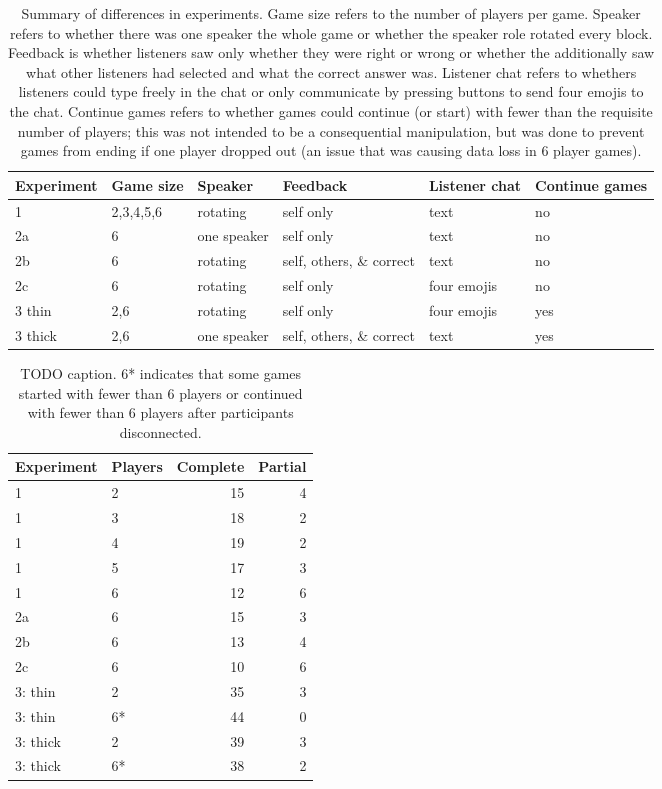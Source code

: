 \documentclass[
  english,
  a4paper,
]{article}
\begin{document}
\begin{table}

\caption{\label{tab:overview}Summary of differences in experiments. Game size refers to the number of players per game. Speaker refers to whether there was one speaker the whole game or whether the speaker role rotated every block. Feedback is whether listeners saw only whether they were right or wrong or whether the additionally saw what other listeners had selected and what the correct answer was. Listener chat refers to whethers listeners could type freely in the chat or only communicate by pressing buttons to send four emojis to the chat. Continue games refers to whether games could continue (or start) with fewer than the requisite number of players; this was not intended to be a consequential manipulation, but was done to prevent games from ending if one player dropped out (an issue that was causing data loss in 6 player games). }
\centering
\begin{tabular}[t]{l|l|l|l|l|l}
\hline
Experiment & Game size & Speaker & Feedback & Listener chat & Continue games\\
\hline
1 & 2,3,4,5,6 & rotating & self only & text & no\\
\hline
2a & 6 & one speaker & self only & text & no\\
\hline
2b & 6 & rotating & self, others, \& correct & text & no\\
\hline
2c & 6 & rotating & self only & four emojis & no\\
\hline
3 thin & 2,6 & rotating & self only & four emojis & yes\\
\hline
3 thick & 2,6 & one speaker & self, others, \& correct & text & yes\\
\hline
\end{tabular}
\end{table}
\begin{table}

\caption{\label{tab:participants}TODO caption. 6* indicates that some games started with fewer than 6 players or continued with fewer than 6 players after participants disconnected.}
\centering
\begin{tabular}[t]{l|l|r|r}
\hline
Experiment & Players & Complete & Partial\\
\hline
1 & 2 & 15 & 4\\
\hline
1 & 3 & 18 & 2\\
\hline
1 & 4 & 19 & 2\\
\hline
1 & 5 & 17 & 3\\
\hline
1 & 6 & 12 & 6\\
\hline
2a & 6 & 15 & 3\\
\hline
2b & 6 & 13 & 4\\
\hline
2c & 6 & 10 & 6\\
\hline
3: thin & 2 & 35 & 3\\
\hline
3: thin & 6* & 44 & 0\\
\hline
3: thick & 2 & 39 & 3\\
\hline
3: thick & 6* & 38 & 2\\
\hline
\end{tabular}
\end{table}
\end{document}
